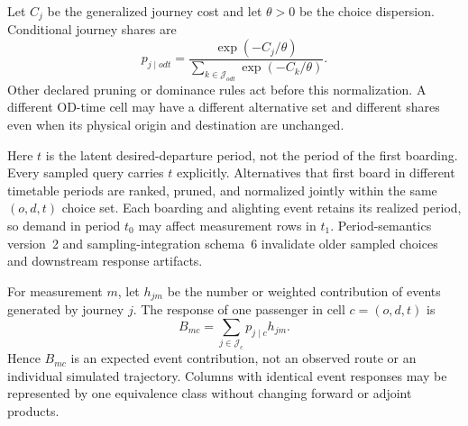 Let $C_j$ be the generalized journey cost and let $\theta>0$ be the choice
dispersion. Conditional journey shares are
\[
 p_{j\mid odt}
 =\frac{\exp(-C_j/\theta)}
        {\sum_{k\in\mathcal J_{odt}}\exp(-C_k/\theta)}.
\]
Other declared pruning or dominance rules act before this normalization. A
different OD-time cell may have a different alternative set and different
shares even when its physical origin and destination are unchanged.

Here $t$ is the latent desired-departure period, not the period of the first
boarding. Every sampled query carries $t$ explicitly. Alternatives that first
board in different timetable periods are ranked, pruned, and normalized
jointly within the same $(o,d,t)$ choice set. Each boarding and alighting event
retains its realized period, so demand in period $t_0$ may affect measurement
rows in $t_1$. Period-semantics version~2 and sampling-integration schema~6
invalidate older sampled choices and downstream response artifacts.

For measurement $m$, let $h_{jm}$ be the number or weighted contribution of
events generated by journey $j$. The response of one passenger in cell
$c=(o,d,t)$ is
\[
 B_{mc}=\sum_{j\in\mathcal J_c}p_{j\mid c}h_{jm}.
\]
Hence $B_{mc}$ is an expected event contribution, not an observed route or an
individual simulated trajectory. Columns with identical event responses may be
represented by one equivalence class without changing forward or adjoint
products.
